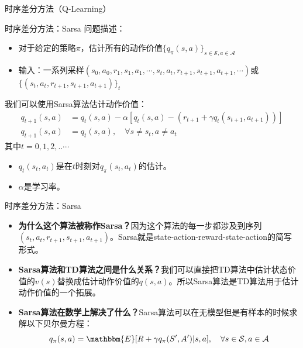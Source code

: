 \begin{section}{时序差分方法\alert{（Q-Learning）}}
\begin{frame}{时序差分方法：Sarsa}
    问题描述：
    \begin{itemize}
        \item 对于给定的策略$\pi$，估计所有的动作价值$\{q_\pi(s, a)\}_{s\in \mathcal{S}, a\in\mathcal{A}}$
        \item 输入：一系列采样\alert{$(s_0, a_0, r_1, s_1, a_1,\cdots,s_t, a_t, r_{t+1}, s_{t+1}, a_{t+1},\cdots)$}或$\{(s_t, a_t, r_{t+1}, s_{t+1}, a_{t+1})\}_t$
    \end{itemize}
    我们可以使用Sarsa算法估计动作价值：
    \[
        \begin{aligned}
            q_{t+1}(s,a)&=q_t(s,a)-\alpha[q_t(s,a)-(r_{t+1}+\gamma q_t(s_{t+1},a_{t+1}))] \\
            q_{t+1}(s,a)&=q_t(s,a), \quad \forall s\neq s_t, a\neq a_t
        \end{aligned}
    \]
    其中$t=0,1,2,..\cdots$
    \begin{itemize}
        \item $q_t(s_t,a_t)$是在$t$时刻对$q_\pi(s_t,a_t)$的估计。
        \item $\alpha$是学习率。
    \end{itemize}
\end{frame}

\begin{frame}{时序差分方法：Sarsa}
    \begin{itemize}
        \item \textbf{为什么这个算法被称作Sarsa？}因为这个算法的每一步都涉及到序列$(s_t, a_t, r_{t+1}, s_{t+1}, a_{t+1})$。Sarsa就是state-action-reward-state-action的简写形式。
        \item \textbf{Sarsa算法和TD算法之间是什么关系？}我们可以直接把TD算法中估计状态价值的$v(s)$替换成估计动作价值的$q(s,a)$。所以Sarsa算法是TD算法用于估计动作价值的一个拓展。
        \item \textbf{Sarsa算法在数学上解决了什么？}Sarsa算法可以在\alert{无模型}但是\alert{有样本}的时候求解以下贝尔曼方程：
        \[
            q_\pi(s,a)=\mathbbm{E}[R+\gamma q_\pi(S',A')|s,a], \quad \forall s\in\mathcal{S}, a\in\mathcal{A}
        \]
    \end{itemize}   
\end{frame}


\end{section}
